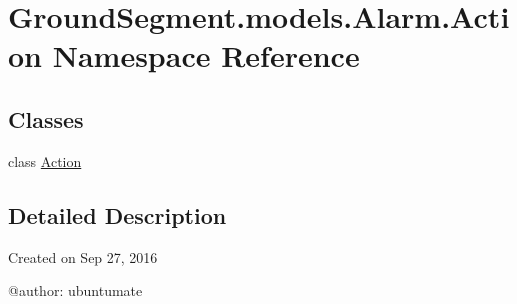 \hypertarget{namespace_ground_segment_1_1models_1_1_alarm_1_1_action}{}\section{Ground\+Segment.\+models.\+Alarm.\+Action Namespace Reference}
\label{namespace_ground_segment_1_1models_1_1_alarm_1_1_action}
\subsection*{Classes}
\begin{DoxyCompactItemize}
\item 
class \hyperlink{class_ground_segment_1_1models_1_1_alarm_1_1_action_1_1_action}{Action}
\end{DoxyCompactItemize}


\subsection{Detailed Description}
\begin{DoxyVerb}Created on Sep 27, 2016

@author: ubuntumate
\end{DoxyVerb}
 